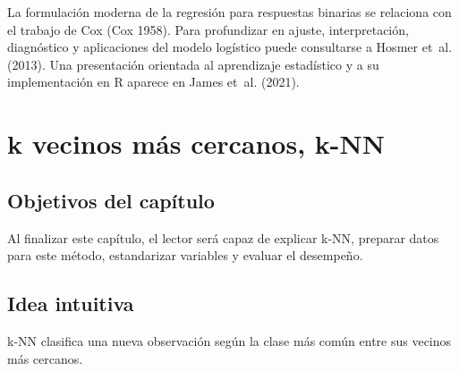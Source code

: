 \documentclass[
  spanish,
  10.5pt,
  letterpaper,
  openany,
  headings=big]{scrbook}
\begin{document}
La formulación moderna de la regresión para respuestas binarias se
relaciona con el trabajo de Cox (Cox 1958). Para profundizar en ajuste,
interpretación, diagnóstico y aplicaciones del modelo logístico puede
consultarse a Hosmer et~al. (2013). Una presentación orientada al
aprendizaje estadístico y a su implementación en R aparece en James
et~al. (2021).


\chapter{k vecinos más cercanos,
k-NN}\label{k-vecinos-muxe1s-cercanos-k-nn}

\section{Objetivos del capítulo}\label{objetivos-del-capuxedtulo-5}

Al finalizar este capítulo, el lector será capaz de explicar k-NN,
preparar datos para este método, estandarizar variables y evaluar el
desempeño.

\section{Idea intuitiva}\label{idea-intuitiva}

k-NN clasifica una nueva observación según la clase más común entre sus
vecinos más cercanos.
\end{document}
